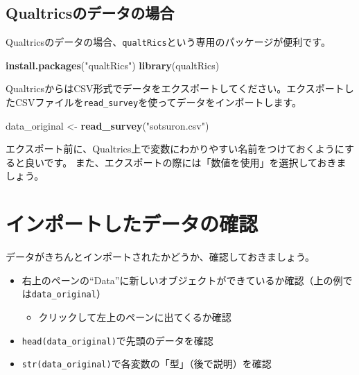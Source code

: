 \documentclass[]{book}
\newenvironment{Shaded}{\begin{snugshade}}{\end{snugshade}}
\newcommand{\KeywordTok}[1]{\textcolor[rgb]{0.13,0.29,0.53}{\textbf{#1}}}
\newcommand{\StringTok}[1]{\textcolor[rgb]{0.31,0.60,0.02}{#1}}
\newcommand{\NormalTok}[1]{#1}
\providecommand{\tightlist}{%
  \setlength{\itemsep}{0pt}\setlength{\parskip}{0pt}}
\begin{document}
\subsection{Qualtricsのデータの場合}\label{qualtricsux306eux30c7ux30fcux30bfux306eux5834ux5408}

Qualtricsのデータの場合、\texttt{qualtRics}という専用のパッケージが便利です。

\begin{Shaded}
\begin{Highlighting}[]
\KeywordTok{install.packages}\NormalTok{(}\StringTok{"qualtRics"}\NormalTok{)}
\KeywordTok{library}\NormalTok{(qualtRics)}
\end{Highlighting}
\end{Shaded}

QualtricsからはCSV形式でデータをエクスポートしてください。エクスポートしたCSVファイルを\texttt{read\_survey}を使ってデータをインポートします。

\begin{Shaded}
\begin{Highlighting}[]
\NormalTok{data_original <-}\StringTok{ }\KeywordTok{read_survey}\NormalTok{(}\StringTok{"sotsuron.csv"}\NormalTok{)}
\end{Highlighting}
\end{Shaded}

エクスポート前に、Qualtrics上で変数にわかりやすい名前をつけておくようにすると良いです。
また、エクスポートの際には「数値を使用」を選択しておきましょう。

\section{インポートしたデータの確認}\label{ux30a4ux30f3ux30ddux30fcux30c8ux3057ux305fux30c7ux30fcux30bfux306eux78baux8a8d}

データがきちんとインポートされたかどうか、確認しておきましょう。

\begin{itemize}
\tightlist
\item
  右上のペーンの``Data''に新しいオブジェクトができているか確認（上の例では\texttt{data\_original}）

  \begin{itemize}
  \tightlist
  \item
    クリックして左上のペーンに出てくるか確認
  \end{itemize}
\item
  \texttt{head(data\_original)}で先頭のデータを確認
\item
  \texttt{str(data\_original)}で各変数の「型」（後で説明）を確認
\end{itemize}
\end{document}
